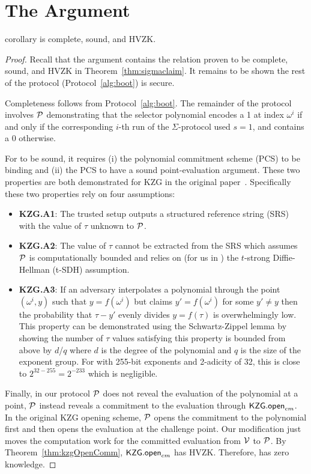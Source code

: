 
\section{The \bootstrap Argument}

\begin{restatable}{corollary}{}
\label{thm:keys}
\bootstrap is complete, sound, and HVZK.
\end{restatable}

\begin{proof}
Recall that the \bootstrap argument contains the relation proven to be complete, sound, and HVZK in Theorem~\ref{thm:sigmaclaim}. It remains to be shown the rest of the protocol (Protocol~\ref{alg:boot}) is secure.

Completeness follows from Protocol~\ref{alg:boot}. The remainder of the protocol involves $\mathcal{P}$ demonstrating that the selector polynomial encodes a 1 at index $\omega^i$ if and only if the corresponding $i$-th run of the $\Sigma$-protocol used $s=1$, and contains a 0 otherwise.

For \bootstrap to be sound, it requires (i) the polynomial commitment scheme (PCS) to be binding and (ii) the PCS to have a sound point-evaluation argument. These two properties are both demonstrated for KZG in the original paper~\cite{kzg}. Specifically these two properties rely on four assumptions:
\begin{itemize}
\item \textbf{KZG.A1}: The trusted setup outputs a structured reference string (SRS) with the value of $\tau$ unknown to $\mathcal{P}$. 
\item \textbf{KZG.A2}: The value of $\tau$ cannot be extracted from the SRS which assumes $\mathcal{P}$ is computationally bounded and relies on (for us in \bls) the $t$-strong Diffie-Hellman (t-SDH) assumption.
\item \textbf{KZG.A3}: If an adversary interpolates a polynomial through the point $(\omega^i,y)$ such that $y=f(\omega^i)$ but claims $y'=f(\omega^i)$ for some $y'\neq y$ then the probability that $\tau-y'$ evenly divides $y=f(\tau)$ is overwhelmingly low. This property can be demonstrated using the Schwartz-Zippel lemma by showing the number of $\tau$ values satisfying this property is bounded from above by $d$/$q$ where $d$ is the degree of the polynomial and $q$ is the size of the exponent group. For \bls with 255-bit exponents and 2-adicity of 32, this is close to $2^{32-255}=2^{-233}$ which is negligible.
\end{itemize}

Finally, in our protocol $\mathcal{P}$ does not reveal the evaluation of the polynomial at a point, $\mathcal{P}$ instead reveals a commitment to the evaluation through $\mathsf{KZG.open}_{cm}$. In the original KZG opening scheme, $\mathcal{P}$ opens the commitment to the polynomial first and then opens the evaluation at the challenge point. Our modification just moves the computation work for the committed evaluation from $\mathcal{V}$ to $\mathcal{P}$. By Theorem~\ref{thm:kzgOpenComm}, $\mathsf{KZG.open}_{cm}$ has HVZK. Therefore, \bootstrap has zero knowledge.
\end{proof}

